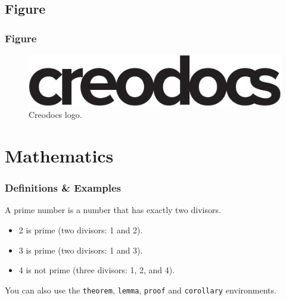 \documentclass[
	11pt, %
	aspectratio=169, %
]{beamer}
\begin{document}

\subsection{Figure}

\begin{frame}
	\frametitle{Figure}
	
	\begin{figure}
		\includegraphics[width=0.8\linewidth]{creodocs_logo.pdf}
		\caption{Creodocs logo.}
	\end{figure}
\end{frame}


\section{Mathematics}

\begin{frame}
	\frametitle{Definitions \& Examples}
	
	\begin{definition}
		A \alert{prime number} is a number that has exactly two divisors.
	\end{definition}
	
	\smallskip %
	
	\begin{example}
		\begin{itemize}
			\item 2 is prime (two divisors: 1 and 2).
			\item 3 is prime (two divisors: 1 and 3).
			\item 4 is not prime (\alert{three} divisors: 1, 2, and 4).
		\end{itemize}
	\end{example}
	
	\smallskip %
	
	You can also use the \texttt{theorem}, \texttt{lemma}, \texttt{proof} and \texttt{corollary} environments.
\end{frame}

\end{document}
